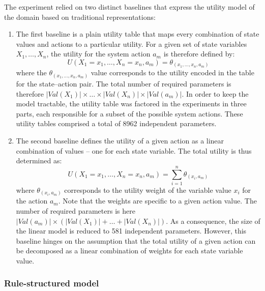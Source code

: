 The experiment relied on two distinct baselines that express the utility model of the domain based on traditional representations: \begin{enumerate}
\item The first baseline is a plain utility table that maps every combination of state values and actions to a particular utility.  For a given set of state variables $X_1, \dots, X_n$, 
the utility for the system action $a_m$ is therefore defined by: 
\begin{equation}
U(X_1=x_1, \dots, X_n=x_n, a_m) = \theta_{(x_1, \dots, x_n, a_m)}
\end{equation}
where the $\theta_{(x_1, \dots, x_n, a_m)}$ value corresponds to the utility encoded in the table for the state--action pair. The total number of required parameters is therefore $|\mathit{Val}(X_1)| \times \dots \times |\mathit{Val}(X_n)| \times |\mathit{Val}(a_m)|$. In order to keep the model tractable, the utility table was factored in the experiments in three parts, each responsible for a subset of the possible system actions. These utility tables comprised a total of 8962 independent parameters. 
\item The second baseline defines the utility of a given action as a linear combination of values -- one for each state variable.  The total utility is thus determined as:
\begin{equation}
U(X_1=x_1, \dots, X_n=x_n, a_m) = \sum_{i=1}^{n} \theta_{(x_i, a_m)}
\end{equation}
where $\theta_{(x_i, a_m)}$ corresponds to the utility weight of the variable value $x_i$ for the action $a_m$.  Note that the weights are specific to a given action value. The number of required parameters is here $|\mathit{Val}(a_m)| \times (|\mathit{Val}(X_1)| + \dots + |\mathit{Val}(X_n)|)$.  As a consequence, the size of the linear model is reduced to 581 independent parameters.  However, this baseline hinges on the assumption that the total utility of a given action can be decomposed as a linear combination of weights for each state variable value.
\end{enumerate}

\subsubsection*{Rule-structured model}

